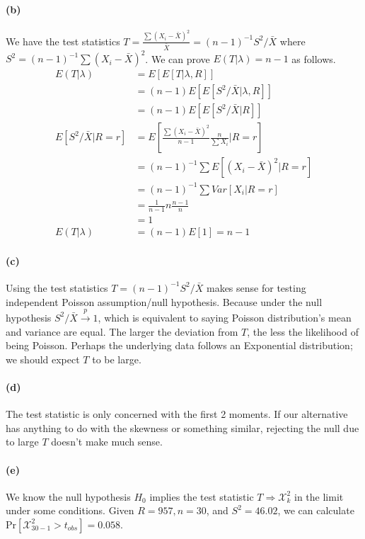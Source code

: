 \documentclass[11pt, letterpaper]{article}
\begin{document}
\paragraph{(b)} 
We have the test statistics $T = \frac{\sum (X_i - \bar{X})^2}{\bar{X}} = (n-1)^{-1} S^2/\bar{X}$ where $S^2 = (n-1)^{-1} \sum(X_i - \bar{X})^2$. We can prove $E(T|\lambda) = n-1$ as follows.
\begin{align*}
    E(T|\lambda) &= E[E[T|\lambda, R]] \\
        &= (n-1) E[E[S^2/\bar{X}|\lambda, R]] \\
        &= (n-1) E[E[S^2/\bar{X}|R]] \\
    E[S^2/\bar{X}|R=r] &= E \left[\frac{\sum (X_i-\bar{X})^2}{n-1} \frac{n}{\sum X_i} | R=r \right] \\
        &= (n-1)^{-1} \sum E[(X_i-\bar{X})^2|R=r] \\
        &= (n-1)^{-1} \sum Var[X_i|R=r] \\
        &= \frac{1}{n-1} n \frac{n-1}{n} \\
        &= 1 \\
    E(T|\lambda) &= (n-1) E[1] = n-1
\end{align*}

\paragraph{(c)}
Using the test statistics $T = (n-1)^{-1} S^2/\bar{X}$ makes sense for testing independent Poisson assumption/null hypothesis. Because under the null hypothesis $S^2/\bar{X} \xrightarrow{p} 1$, which is equivalent to saying Poisson distribution's mean and variance are equal. The larger the deviation from $T$, the less the likelihood of being Poisson. Perhaps the underlying data follows an Exponential distribution; we should expect $T$ to be large.

\paragraph{(d)}
The test statistic is only concerned with the first 2 moments. If our alternative has anything to do with the skewness or something similar, rejecting the null due to large $T$ doesn't make much sense.

\paragraph{(e)}
We know the null hypothesis $H_0$ implies the test statistic $T \Rightarrow \mathcal{X}^2_{k}$ in the limit under some conditions. Given $R = 957, n=30$, and $S^2 = 46.02$, we can calculate $\text{Pr}[\mathcal{X}^2_{30-1}>t_{obs}] = 0.058$.
\end{document}
